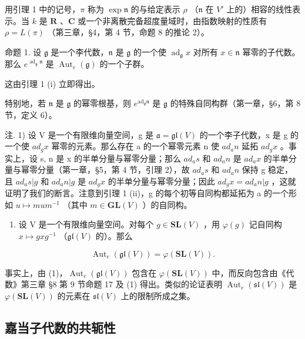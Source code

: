 用引理 1 中的记号，\(\pi\) 称为 \(\exp \mathfrak{n}\) 的与给定表示 \(\rho\) （\(\mathfrak{n}\) 在 \(V'\) 上的）相容的线性表示。当 \(k\) 是 \(\mathbf{R}\) 、\(\mathbf{C}\) 或一个非离散完备超度量域时，由指数映射的性质有 \(\rho = L(\pi)\) （第三章，§4，第 4 节，命题 8 的推论 2）。

命题 1. 设 \(\mathfrak{g}\) 是一个李代数，\(\mathfrak{n}\) 是 \(\mathfrak{g}\) 的一个使 \(\operatorname{ad}_{\mathfrak{g}}x\) 对所有 \(x\in \mathfrak{n}\) 幂零的子代数。那么 \(e^{\operatorname{ad}_{\mathfrak{g}}\mathfrak{n}}\) 是 \(\operatorname{Aut}_e(\mathfrak{g})\) 的一个子群。

这由引理 1 (i) 立即得出。

特别地，若 \(\mathfrak{n}\) 是 \(\mathfrak{g}\) 的幂零根基，则 \(e^{\mathrm{ad}_{\mathfrak{g}}\mathfrak{n}}\) 是 \(\mathfrak{g}\) 的特殊自同构群（第一章，§6，第 8 节，定义 6）。

注. 1) 设 V 是一个有限维向量空间，g 是 \(\mathfrak{a} = \mathfrak{gl}(V)\) 的一个李子代数，x 是 g 的一个使 \(ad_{g}x\) 幂零的元素。那么存在 a 的一个幂零元素 n 使 \(ad_{a}n\) 延拓 \(ad_{g}x\) 。事实上，设 s, n 是 x 的半单分量与幂零分量；那么 \(ad_{a}s\) 和 \(ad_{a}n\) 是 \(ad_{a}x\) 的半单分量与幂零分量（第一章，§5，第 4 节，引理 2），故 \(ad_{a}s\) 和 \(ad_{a}n\) 保持 g 稳定，且 \(ad_{a}s|g\) 和 \(ad_{a}n|g\) 是 \(ad_{g}x\) 的半单分量与幂零分量；因此 \(ad_{g}x = ad_{a}n|g\) ，这就证明了我们的断言。注意到引理 1 (ii)，g 的每个初等自同构都延拓为 a 的一个形如 \(u \mapsto mum^{-1}\) （其中 \(m \in \mathbf{GL}(V)\) ）的自同构。

\begin{enumerate}
\def\labelenumi{\arabic{enumi})}
\setcounter{enumi}{1}
\tightlist
\item
  设 V 是一个有限维向量空间。对每个 \(g \in \mathbf{SL}(V)\) ，用 \(\varphi(g)\) 记自同构 \(x \mapsto gxg^{-1}\) （\(\mathfrak{gl}(V)\) 的）。那么
\end{enumerate}

\[
\operatorname{Aut} _ {e} (\mathfrak {g l} (V)) = \varphi (\mathbf {S L} (V)).
\]

事实上，由 (1)，\(\operatorname{Aut}_{e}(\mathfrak{gl}(V))\) 包含在 \(\varphi(\mathbf{SL}(V))\) 中，而反向包含由《代数》第三章 §8 第 9 节命题 17 及 (1) 得出。类似的论证表明 \(\operatorname{Aut}_{e}(\mathfrak{sl}(V))\) 是 \(\varphi(\mathbf{SL}(V))\) 的元素在 \(\mathfrak{sl}(V)\) 上的限制所成之集。

\subsection{嘉当子代数的共轭性}

